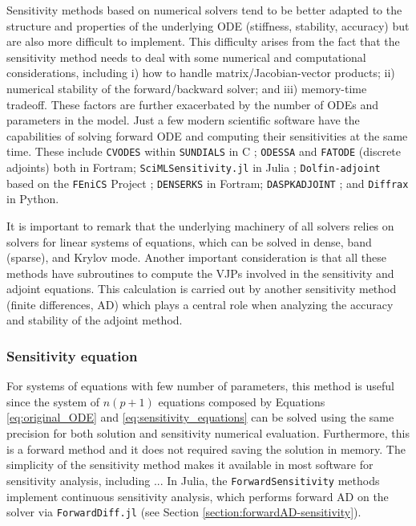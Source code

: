 
Sensitivity methods based on numerical solvers tend to be better adapted to the structure and properties of the underlying ODE (stiffness, stability, accuracy) but are also more difficult to implement.  
This difficulty arises from the fact that the sensitivity method needs to deal with some numerical and computational considerations, including i) how to handle matrix/Jacobian-vector products; ii) numerical stability of the forward/backward solver; and iii) memory-time tradeoff. 
These factors are further exacerbated by the number of ODEs and parameters in the model. 
Just a few modern scientific software have the capabilities of solving forward ODE and computing their sensitivities at the same time. 
These include 
\texttt{CVODES} within \texttt{SUNDIALS} in C \cite{serban2005cvodes, SUNDIALS-hindmarsh2005sundials}; 
\texttt{ODESSA} \cite{ODESSA} and \texttt{FATODE} (discrete adjoints) \cite{FATODE2014} both in Fortram; 
\texttt{SciMLSensitivity.jl} in Julia \cite{rackauckas2020universal}; 
\texttt{Dolfin-adjoint} based on the \texttt{FEniCS} Project \cite{dolfin2013, dolfin2018};
\texttt{DENSERKS} in Fortram\cite{alexe2007denserks}; 
\texttt{DASPKADJOINT} \cite{Cao_Li_Petzold_2002};
and \texttt{Diffrax} in Python\cite{kidger2021on}. 

It is important to remark that the underlying machinery of all solvers relies on solvers for linear systems of equations, which can be solved in dense, band (sparse), and Krylov mode. 
Another important consideration is that all these methods have subroutines to compute the VJPs involved in the sensitivity and adjoint equations. 
This calculation is carried out by another sensitivity method (finite differences, AD) which plays a central role when analyzing the accuracy and stability of the adjoint method. 

\subsubsection{Sensitivity equation}
\label{section:computing-sensitivity-equations}

For systems of equations with few number of parameters, this method is useful since the system of $n(p+1)$ equations composed by Equations \eqref{eq:original_ODE} and \eqref{eq:sensitivity_equations} can be solved using the same precision for both solution and sensitivity numerical evaluation. 
Furthermore, this is a forward method and it does not required saving the solution in memory. 
The simplicity of the sensitivity method makes it available in most software for sensitivity analysis, including ... 
In Julia, the \texttt{ForwardSensitivity} methods implement continuous sensitivity analysis, which performs forward AD on the solver via \texttt{ForwardDiff.jl} (see Section \ref{section:forwardAD-sensitivity}).

